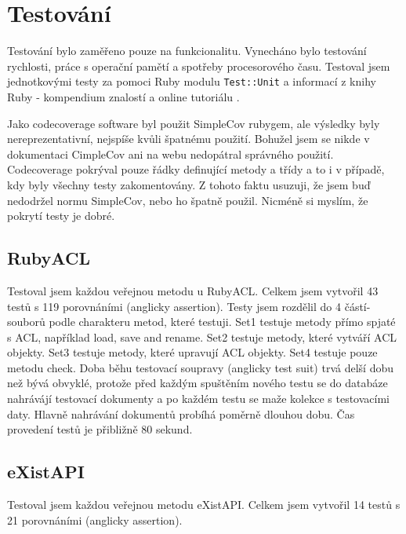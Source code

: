 \chapter{Testování}

Testování bylo zaměřeno pouze na funkcionalitu. Vynecháno bylo testování rychlosti, práce s operační pamětí a spotřeby procesorového času. Testoval jsem jednotkovými testy za pomoci Ruby modulu \verb|Test::Unit| a informací z knihy Ruby - kompendium znalostí \cite{Ruby} a online tutoriálu \cite{ibm:unittesting}.

Jako codecoverage software byl použit SimpleCov rubygem, ale výsledky byly nereprezentativní, nejspíše kvůli špatnému použití. Bohužel jsem se nikde v dokumentaci CimpleCov ani na webu nedopátral správného použití. Codecoverage pokrýval pouze řádky definující metody a třídy a to i v případě, kdy byly všechny testy zakomentovány. Z tohoto faktu usuzuji, že jsem buď nedodržel normu SimpleCov, nebo ho špatně použil. Nicméně si myslím, že pokrytí testy je dobré.

\section{RubyACL}
Testoval jsem každou veřejnou metodu u RubyACL. Celkem jsem vytvořil 43 testů s 119 porovnáními (anglicky assertion). Testy jsem rozdělil do 4 částí-souborů podle charakteru metod, které testuji. Set1 testuje metody přímo spjaté s ACL, například load, save and rename. Set2 testuje metody, které vytváří ACL objekty. Set3 testuje metody, které upravují ACL objekty. Set4 testuje pouze metodu check.
Doba běhu testovací soupravy (anglicky test suit) trvá delší dobu než bývá obvyklé, protože před každým spuštěním nového testu se do databáze nahrávájí testovací dokumenty a po každém testu se maže kolekce s testovacími daty. Hlavně nahrávání dokumentů probíhá poměrně dlouhou dobu. Čas provedení testů je přibližně 80 sekund.

\section{eXistAPI}
Testoval jsem každou veřejnou metodu eXistAPI. Celkem jsem vytvořil 14 testů s 21 porovnáními (anglicky assertion). 